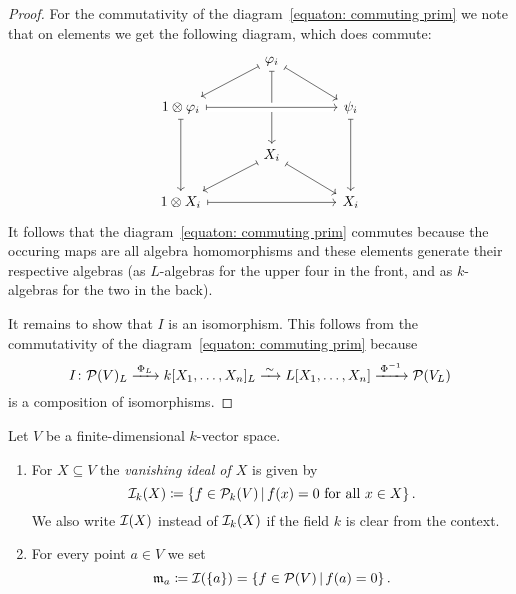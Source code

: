 \begin{proof}
    For the commutativity of the diagram~\eqref{equaton: commuting prim} we note that on elements we get the following diagram, which does commute:
    \[
      \begin{tikzcd}[column sep = large]
          {}
        & \varphi_i
          \arrow[mapsto]{dl}
          \arrow[mapsto]{dr}
          \arrow[mapsto]{dd}
        & {}
        \\
          1 \otimes \varphi_i
          \arrow[crossing over, mapsto]{rr}
          \arrow[mapsto]{dd}
        & {}
        & \psi_i
          \arrow[mapsto]{dd}
        \\
          {}
        & X_i
          \arrow[mapsto]{dl}
          \arrow[mapsto]{dr}
        & {}
        \\
          1 \otimes X_i
          \arrow[mapsto]{rr}
        & {}
        & X_i
      \end{tikzcd}
    \]
    It follows that the diagram~\eqref{equaton: commuting prim} commutes because the occuring maps are all algebra homomorphisms and these elements generate their respective algebras (as $L$-algebras for the upper four in the front, and as $k$-algebras for the two in the back).
    
    It remains to show that $I$ is an isomorphism.
    This follows from the commutativity of the diagram~\eqref{equaton: commuting prim} because
    \[
                                  I
      \colon                      \mathcal{P}(V)_L
      \xrightarrow{\,\Phi_L\,}    k[X_1, \dotsc, X_n]_L
      \xrightarrow{\,\sim\,}      L[X_1, \dotsc, X_n]
      \xrightarrow{\,\Phi^{-1}\,} \mathcal{P}(V_L)
    \]
    is a composition of isomorphisms.
\end{proof}


\begin{definition}
  \label{definition: vanishing ideal}
  Let $V$ be a finite-dimensional $k$-vector space.
  \begin{enumerate}
    \item
      For $X \subseteq V$ the \emph{vanishing ideal of $X$} is given by
      \[
        \mc{I}_k(X)
        \defined  \{
                    f \in \mc{P}_k(V)
                  \suchthat
                    \text{$f(x) = 0$ for all $x \in X$}
                  \} \,.
      \]
      We also write $\mathcal{I}(X)$ instead of $\mathcal{I}_k(X)$ if the field $k$ is clear from the context.
    \item
      For every point $a \in V$ we set
      \[
                  \mf{m}_a
        \defined  \mc{I}(\{a\})
        =         \{
                    f \in \mc{P}(V)
                  \suchthat
                    f(a) = 0
                  \} \,.
      \]
  \end{enumerate}
\end{definition}


